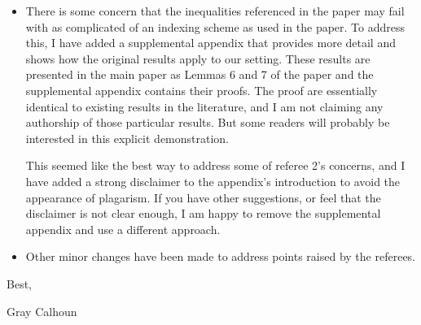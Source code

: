\documentclass[12pt]{article}
\begin{document}
\begin{itemize}
\item There is some concern that the inequalities referenced in the
  paper may fail with as complicated of an indexing scheme as used in
  the paper. To address this, I have added a supplemental appendix
  that provides more detail and shows how the original results apply
  to our setting. These results are presented in the main paper as
  Lemmas 6 and 7 of the paper and the supplemental appendix contains
  their proofs. The proof are essentially identical to existing
  results in the literature, and I am not claiming any authorship of
  those particular results. But some readers will probably be
  interested in this explicit demonstration.

  This seemed like the best way to address some of referee 2's
  concerns, and I have added a strong disclaimer to the appendix's
  introduction to avoid the appearance of plagarism. If you have other
  suggestions, or feel that the disclaimer is not clear enough, I am
  happy to remove the supplemental appendix and use a different
  approach.

\item Other minor changes have been made to address points raised by
  the referees.
\end{itemize}

Best,

Gray Calhoun
\end{document}
